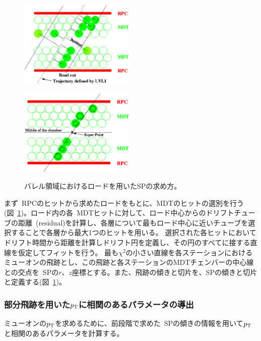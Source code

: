 \begin{figure}[h]
  \begin{minipage}[b]{0.45\linewidth}
      \centering
      \includegraphics[clip, width=5.5cm]{fig/3/mdtResidual.png}
      \label{fig:3-6-1}
  \end{minipage}
    \begin{minipage}[b]{0.5\linewidth}
      \centering
      \includegraphics[clip, width=5.5cm]{fig/3/mdtRoad.png}
      \label{fig:3-6-2}
  \end{minipage}
  \caption{バレル領域におけるロードを用いたSPの求め方\cite{article:onlineMuonReconstruction}。}
\end{figure}

まず~RPCのヒットから求めたロードをもとに、MDTのヒットの選別を行う(図~\ref{fig:3-6-2})。ロード内の各~MDTヒットに対して、ロード中心からのドリフトチューブの距離~(residual)を計算し、各層について最もロード中心に近いチューブを選択することで各層から最大1つのヒットを用いる。
選択された各ヒットにおいてドリフト時間から距離を計算しドリフト円を定義し、その円のすべてに接する直線を仮定してフィットを行う。
最も$\chi^2$の小さい直線を各ステーションにおけるミューオンの飛跡とし、この飛跡と各ステーションのMDTチェンバーの中心線との交点を~SPの$r$、$z$座標とする。また、飛跡の傾きと切片を、SPの傾きと切片と定義する(図~\ref{fig:3-6-2})。


\subsubsection{部分飛跡を用いた$p_\mathrm{T}$に相関のあるパラメータの導出}
ミューオンの$p_\mathrm{T}$を求めるために、前段階で求めた~SPの傾きの情報を用いて$p_\mathrm{T}$と相関のあるパラメータを計算する。

